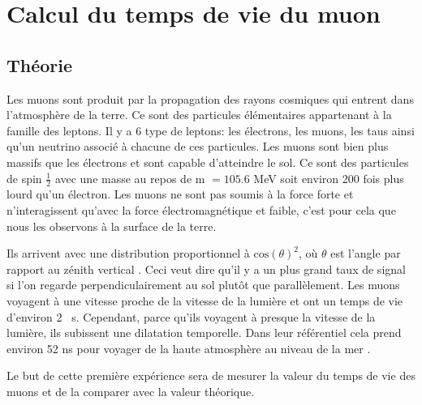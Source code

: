 \documentclass[12pt]{article}
\begin{document}
\newpage
\section{Calcul du temps de vie du muon}
\subsection{Théorie}

Les muons sont produit par la propagation des rayons cosmiques qui entrent dans l'atmosphère de la terre. Ce sont des particules élémentaires appartenant à la famille des leptons. Il y a 6 type de leptons: les électrons, les muons, les taus ainsi qu'un neutrino associé à chacune de ces particules. Les muons sont bien plus massifs que les électrons et sont capable d'atteindre le sol. Ce sont des particules de spin $\frac{1}{2}$ avec une masse au repos de m $=105.6$ MeV soit environ 200 fois plus lourd qu'un électron. Les muons ne sont pas soumis à la force forte et n'interagissent qu'avec la force électromagnétique et faible, c'est pour cela que nous les observons à la surface de la terre.

Ils arrivent avec une distribution proportionnel à $\text{cos}(\theta)^2$, où $\theta$ est l'angle par rapport au zénith vertical \cite{PhysRevD.98.030001}. Ceci veut dire qu'il y a un plus grand taux de signal si l'on regarde perpendiculairement au sol plutôt que parallèlement. Les muons voyagent à une vitesse proche de la vitesse de la lumière et ont un temps de vie d'environ 2 \si{\SIUnitSymbolMicro s}. Cependant, parce qu'ils voyagent à presque la vitesse de la lumière, ils subissent une dilatation temporelle. Dans leur référentiel cela prend environ 52 ns pour voyager de la haute atmosphère au niveau de la mer \cite{vest_measuring_2010}.

Le but de cette première expérience sera de mesurer la valeur du temps de vie des muons et de la comparer avec la valeur théorique.
\end{document}
